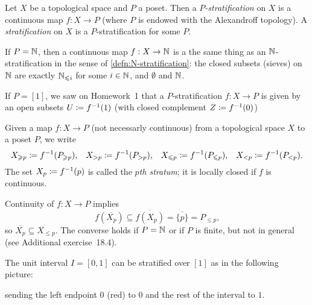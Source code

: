 \begin{defn}
Let \(X\) be a topological space and \(P\) a poset.
Then a \emph{\(P\)-stratification} on \(X\) is a continuous map \(f\colon X\to P\) (where \(P\) is endowed with the Alexandroff topology).
A \emph{stratification} on \(X\) is a \(P\)-stratification for some \(P\).
\end{defn}

\begin{exmp}
If \(P=\mathbb{N}\), then a continuous map \(f\colon X\to\bb N\) is a the same thing as an \(\mathbb{N}\)-stratification in the sense of \cref{defn:N-stratification}: the closed subsets (sieves) on \(\mathbb{N}\) are exactly \(\mathbb{N}_{\leqslant i}\) for some \(i\in\mathbb{N}\), and \(\emptyset\) and \(\mathbb{N}\).
\end{exmp}

\begin{exmp}
If \(P=[1]\), we saw on Homework~1 that a \(P\)-stratification \(f\colon X\to P\) is given by an open subsets \(U\coloneq f^{-1}(1)\) (with closed complement \(Z\coloneq f^{-1}(0)\))
\end{exmp}

\begin{defn}
Given a map \(f\colon X\to P\) (not necessarly continuous) from a topological space \(X\) to a poset \(P\), we write
\[ X_{\geqslant p} \coloneq f^{-1}(P_{\geqslant p})\text{,} \quad X_{>p}\coloneq f^{-1}(P_{>p})\text{,} \quad X_{\leqslant p}\coloneq f^{-1}(P_{\leqslant p})\text{,} \quad X_{<p}\coloneq f^{-1}(P_{<p})\text{.} \]
The set \(X_p\coloneq f^{-1}(p)\) is called the \emph{\(p\)th stratum}; it is locally closed if \(f\) is continuous.
\end{defn}

\begin{rmk}
Continuity of \(f\colon X\to P\) implies
\[ f(\overline{X_p}) \subseteq \overline{f(X_p)} = \overline{\{p\}} = P_{\leq p}\text{,} \]
so \(\overline{X_p}\subseteq X_{\leq p}\).
The converse holds if \(P=\mathbb{N}\) or if \(P\) is finite, but not in general (see Additional exercise~18.4).
\end{rmk}


\begin{exmp}
The unit interval \(I=[0,1]\) can be stratified over \([1]\) as in the following picture:
\begin{center}
\end{center}
sending the left endpoint \(0\) (red) to \(0\) and the rest of the interval to \(1\).
\end{exmp}

